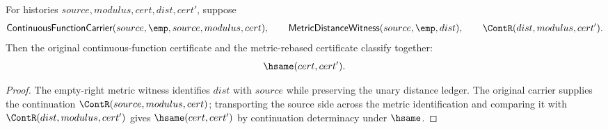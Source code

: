 \begin{theorem}
\label{thm:continuousmap-empty-target-metric-cert-deterministic}
For histories $source,modulus,cert,dist,cert'$, suppose
$$
\mathsf{ContinuousFunctionCarrier}(source,\emp,source,modulus,cert),
\qquad
\mathsf{MetricDistanceWitness}(source,\emp,dist),
\qquad
\ContR(dist,modulus,cert').
$$
Then the original continuous-function certificate and the metric-rebased
certificate classify together:
$$
\hsame(cert,cert').
$$
\end{theorem}
\begin{proof}
The empty-right metric witness identifies $dist$ with $source$ while preserving
the unary distance ledger. The original carrier supplies the continuation
$\ContR(source,modulus,cert)$; transporting the source side across the metric
identification and comparing it with $\ContR(dist,modulus,cert')$ gives
$\hsame(cert,cert')$ by continuation determinacy under $\hsame$.
\end{proof}
